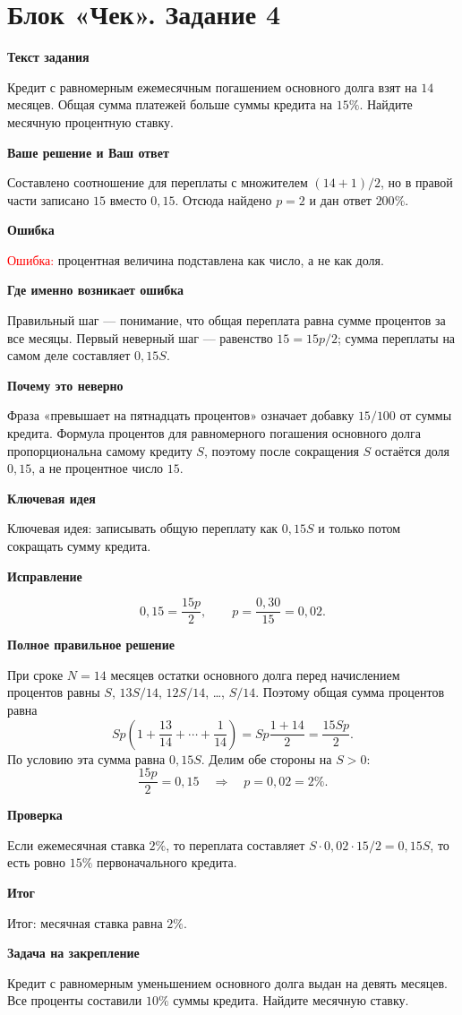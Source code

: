 \documentclass[11pt,a4paper]{article}
\newcommand{\Part}[1]{\par\medskip\noindent\textbf{#1}\par\smallskip}
\newcommand{\Task}[2]{\clearpage\phantomsection\label{task:#1}\section*{#2}}
\newcommand{\Err}[1]{\textcolor{red}{Ошибка:} #1}
\newcommand{\Idea}[1]{\textcolor{blue!60!black}{Ключевая идея:} #1}
\newcommand{\Result}[1]{\textcolor{teal!60!black}{Итог:} #1}
\begin{document}
\Task{c4}{Блок «Чек». Задание 4}
\Part{Текст задания}
Кредит с равномерным ежемесячным погашением основного долга взят на $14$ месяцев. Общая сумма платежей больше суммы кредита на $15\%$. Найдите месячную процентную ставку.
\Part{Ваше решение и Ваш ответ}
Составлено соотношение для переплаты с множителем $(14+1)/2$, но в правой части записано $15$ вместо $0{,}15$. Отсюда найдено $p=2$ и дан ответ $200\%$.
\Part{Ошибка}
\Err{процентная величина подставлена как число, а не как доля.}
\Part{Где именно возникает ошибка}
Правильный шаг --- понимание, что общая переплата равна сумме процентов за все месяцы. Первый неверный шаг --- равенство $15=15p/2$; сумма переплаты на самом деле составляет $0{,}15S$.
\Part{Почему это неверно}
Фраза «превышает на пятнадцать процентов» означает добавку $15/100$ от суммы кредита. Формула процентов для равномерного погашения основного долга пропорциональна самому кредиту $S$, поэтому после сокращения $S$ остаётся доля $0{,}15$, а не процентное число $15$.
\Part{Ключевая идея}
\Idea{записывать общую переплату как $0{,}15S$ и только потом сокращать сумму кредита.}
\Part{Исправление}
\[0{,}15=\frac{15p}{2},\qquad p=\frac{0{,}30}{15}=0{,}02.\]
\Part{Полное правильное решение}
При сроке $N=14$ месяцев остатки основного долга перед начислением процентов равны $S$, $13S/14$, $12S/14$, \ldots, $S/14$. Поэтому общая сумма процентов равна
\[Sp\left(1+\frac{13}{14}+\cdots+\frac1{14}\right)=Sp\frac{1+14}{2}=\frac{15Sp}{2}.\]
По условию эта сумма равна $0{,}15S$. Делим обе стороны на $S>0$:
\[\frac{15p}{2}=0{,}15\quad\Longrightarrow\quad p=0{,}02=2\%.\]
\Part{Проверка}
Если ежемесячная ставка $2\%$, то переплата составляет $S\cdot0{,}02\cdot15/2=0{,}15S$, то есть ровно $15\%$ первоначального кредита.
\Part{Итог}
\Result{месячная ставка равна $2\%$.}
\Part{Задача на закрепление}
Кредит с равномерным уменьшением основного долга выдан на девять месяцев. Все проценты составили $10\%$ суммы кредита. Найдите месячную ставку.
\end{document}
